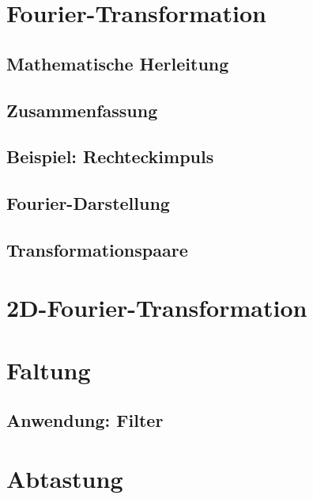 \documentclass[a4paper, 11pt, accentcolor = tud3b]{tudreport}
\begin{document}
		\section{Fourier-Transformation} %

			\subsection{Mathematische Herleitung} %

			\subsection{Zusammenfassung} %

			\subsection{Beispiel: Rechteckimpuls} %

			\subsection{Fourier-Darstellung} %

			\subsection{Transformationspaare} %

		\section{2D-Fourier-Transformation} %

		\section{Faltung} %

			\subsection{Anwendung: Filter} %

		\section{Abtastung} %
\end{document}
